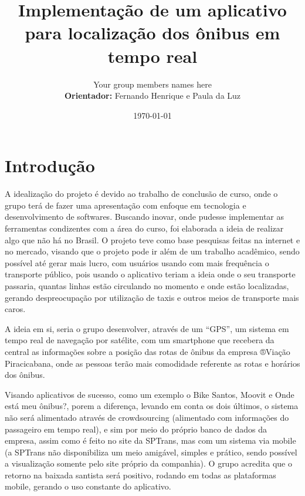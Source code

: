 \documentclass[dvips,12pt]{article}
\begin{document}

\title{Implementação de um aplicativo para localização dos ônibus em tempo real}
\author{Your group members names here\\
\textbf{Orientador:} Fernando Henrique e Paula da Luz
}
\date{\today}



\maketitle


\section{Introdução}

A idealização do projeto é devido ao trabalho de conclusão de curso, onde o grupo terá de fazer uma apresentação com enfoque em tecnologia e desenvolvimento de softwares.
Buscando inovar, onde pudesse implementar as ferramentas condizentes com a área do curso, foi elaborada a ideia de realizar algo que não há no Brasil. O projeto teve como base pesquisas feitas na internet e no mercado, visando que o projeto pode ir além de um trabalho acadêmico, sendo possível até gerar mais lucro, com usuários usando com mais frequência o transporte público, pois usando o aplicativo teriam a ideia onde o seu transporte passaria, quantas linhas estão circulando no momento e onde estão localizadas, gerando despreocupação por utilização de taxis e outros meios de transporte mais caros.

A ideia em si, seria o grupo desenvolver, através de um ``GPS'', um sistema em tempo real de navegação por satélite, com um smartphone que recebera da central as informações sobre a posição das rotas de ônibus da empresa ®Viação Piracicabana, onde as pessoas terão mais comodidade referente as rotas e horários dos ônibus.

Visando aplicativos de sucesso, como um exemplo o Bike Santos, Moovit e Onde está meu ônibus?, porem a diferença, levando em conta os dois últimos, o sistema não será alimentado através de crowdsourcing (alimentado com informações do passageiro em tempo real), e sim por meio do próprio banco de dados da empresa, assim como é feito no site da SPTrans, mas com um sistema via mobile (a SPTrans não disponibiliza um meio amigável, simples e prático, sendo possível a visualização somente pelo site próprio da companhia). O grupo acredita que o retorno  na baixada santista será positivo, rodando em todas as plataformas mobile, gerando o uso constante do aplicativo. 
\end{document}
